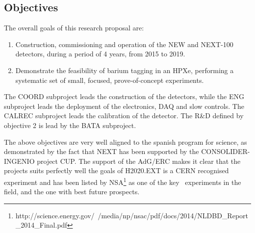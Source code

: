 \subsection*{Objectives}


The overall goals of this research proposal are:

\begin{enumerate}
\item Construction, commissioning and operation of the NEW and NEXT-100 detectors, during a period of 4 years, from 2015 to 2019.
\item Demonstrate the feasibility of barium tagging in an HPXe, performing a systematic set of small, focused, prove-of-concept experiments. 
\end{enumerate}
  
The COORD subproject leads the construction of the detectors, while the ENG subproject leads the deployment of the electronics, DAQ and slow controls. The CALREC subproject leads the calibration of the detector. The R\&D defined by objective 2 is lead by the BATA subproject.  

The above objectives are very well aligned to the spanish program for science, as demonstrated by the fact that NEXT has been supported by the CONSOLIDER-INGENIO project CUP. The support of the AdG/ERC makes it clear that the projects suits perfectly well the goals of H2020.EXT is a CERN recognised experiment and has been listed by NSA\footnote{http://science.energy.gov/~/media/np/nsac/pdf/docs/2014/NLDBD\_Report\_2014\_Final.pdf} as one of the key \bbonu\ experiments in the field, and the one with best future prospects.
